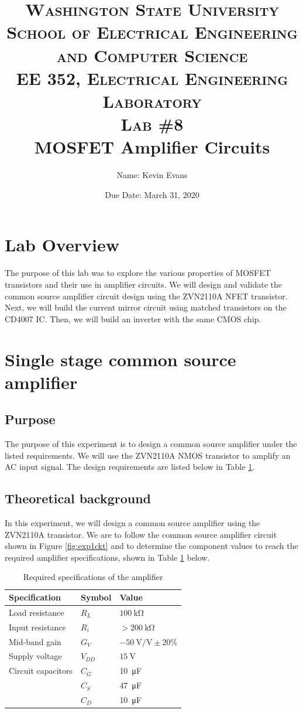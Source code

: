 \documentclass{report}
\title{
	\textsc{ \small
		Washington State University \\
		School of Electrical Engineering and Computer Science \\
		EE 352, Electrical Engineering Laboratory
	} \\
	{\textsc{\small Lab \#8}} \\
	MOSFET Amplifier Circuits
}
\author{
	Name: Kevin Evans
}
\date{Due Date: March 31, 2020}
\begin{document}
\maketitle

\section*{Lab Overview}
The purpose of this lab was to explore the various properties of MOSFET transistors and their use in amplifier circuits. We will design and validate the common source amplifier circuit design using the ZVN2110A NFET transistor. Next, we will build the current mirror circuit using matched transistors on the CD4007 IC. Then, we will build an inverter with the same CMOS chip.
\section{Single stage common source amplifier}

\subsection{Purpose}
The purpose of this experiment is to design a common source amplifier under the listed requirements. We will use the ZVN2110A NMOS transistor to amplify an AC input signal. The design requirements are listed below in Table \ref{table:exp1specs}.
 
\subsection{Theoretical background}
In this experiment, we will design a common source amplifier using the ZVN2110A transistor. We are to follow the common source amplifier circuit shown in Figure \ref{fig:exp1ckt} and to determine the component values to reach the required amplifier specifications, shown in Table \ref{table:exp1specs} below.
\begin{table}[h]
	\caption{Required specifications of the amplifier}
	\label{table:exp1specs}
	\centering
	\begin{tabular}{lll}
		\toprule
		Specification & Symbol & Value \\
		\midrule
		Load resistance & $R_L$ & $\SI{100}{\kohm}$ \\
		Input resistance & $R_i$ & $> \SI{200}{\kohm}$ \\
		Mid-band gain & $G_V$ & $-\SI{50}{\V/\V} \pm 20 \%$ \\
		Supply voltage & $V_{DD}$ & $\SI{15}{\V}$ \\
		Circuit capacitors & $C_G$ & \SI{10}{\micro\farad} \\
		& $C_S$ & \SI{47}{\micro\farad} \\
		& $C_D$ & \SI{10}{\micro\farad} \\
		\bottomrule
	\end{tabular}
\end{table}
\end{document}

